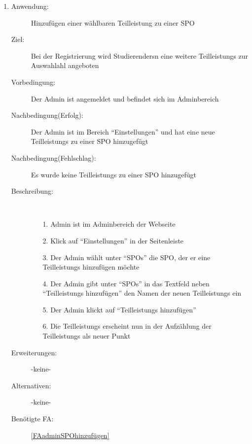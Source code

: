 \documentclass[parskip=full]{scrartcl}
\newcommand{\swtLabel}[1]{\textbf{/#1\arabic*0/}}
\begin{document}
\begin{enumerate} [label=\swtLabel{A}]
  \item \label{UCadminSPOteilleistungAdd}
    \begin{description}
    \item[Anwendung:] Hinzufügen einer wählbaren \gls{Teilleistung} zu einer
    \gls{SPO}
    \item[Ziel:] Bei der Registrierung wird \glspl{Studierender}n eine weitere
    \glspl{Teilleistung} zur Auswahlahl angeboten
    \item[Vorbedingung:] Der \gls{Admin} ist angemeldet und befindet sich im \gls{Admin}bereich
    \item[Nachbedingung(Erfolg):] Der \gls{Admin} ist im Bereich
    \enquote{Einstellungen} und hat eine neue \glspl{Teilleistung} zu einer \gls{SPO}
    hinzugefügt
    \item[Nachbedingung(Fehlschlag):] Es wurde keine \glspl{Teilleistung} zu einer \gls{SPO}
    hinzugefügt
    \item[Beschreibung:]~
    \begin{enumerate}
      \item[1.] \gls{Admin} ist im \gls{Admin}bereich der Webseite
      \item[2.] Klick auf \enquote{Einstellungen} in der Seitenleiste
      \item[3.] Der \gls{Admin} wählt unter \enquote{SPOs} die \gls{SPO}, der er eine
      \glspl{Teilleistung} hinzufügen möchte
      \item[4.] Der \gls{Admin} gibt unter \enquote{SPOs} in das Textfeld
      neben \enquote{\glspl{Teilleistung} hinzufügen} den Namen der neuen \glspl{Teilleistung}
      ein
      \item[5.] Der \gls{Admin} klickt auf \enquote{\glspl{Teilleistung} hinzufügen}
      \item[6.] Die \glspl{Teilleistung} erscheint nun in der Aufzählung der
      \glspl{Teilleistung} als neuer Punkt
    \end{enumerate}
    \item[Erweiterungen:] -keine-
    \item[Alternativen:] -keine-
    \item[Benötigte FA:] \ref{FAadminSPOhinzufügen}
  \end{description}
  

\end{enumerate}
\end{document}
